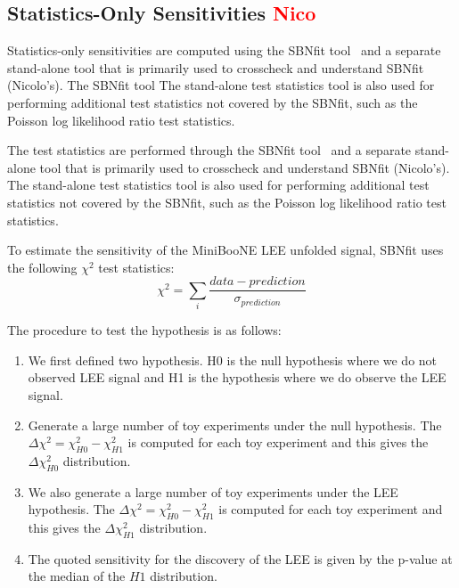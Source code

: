 \documentclass[a4paper]{article}
\begin{document}
\subsection{Statistics-Only Sensitivities \textcolor{red}{Nico}}
\label{subsec:teststats}

Statistics-only sensitivities are computed using the SBNfit tool~\cite{bib:sbnfit20437} and a separate stand-alone tool that is primarily used to crosscheck and understand SBNfit (Nicolo's).
The SBNfit tool 
The stand-alone test statistics tool is also used for performing additional test statistics not covered by the SBNfit, such as the Poisson log likelihood  ratio test statistics.


The test statistics are performed through the SBNfit tool~\cite{bib:sbnfit20437} and a separate stand-alone tool that is primarily used to crosscheck and understand SBNfit (Nicolo's). The stand-alone test statistics tool is also used for performing additional test statistics not covered by the SBNfit, such as the Poisson log likelihood  ratio test statistics.

To estimate the sensitivity of the MiniBooNE LEE unfolded signal, SBNfit uses the following $\chi^2$ test statistics:
\begin{equation}
\chi^2 = \sum_{i} \frac{data - prediction}{\sigma_{prediction}}
\end{equation}

The procedure to test the hypothesis is as follows:
\begin{enumerate}
    \item We first defined two hypothesis. H0 is the null hypothesis where we do not observed LEE signal and H1 is the hypothesis where we do observe the LEE signal. 
    \item Generate a large number of toy experiments under the null hypothesis. The $\Delta \chi^2 = \chi^2_{H0} - \chi^2_{H1}$ is computed for each toy experiment and this gives the $\Delta \chi^2_{H0}$ distribution.
    \item We also generate a large number of toy experiments under the LEE hypothesis. The $\Delta \chi^2 = \chi^2_{H0} - \chi^2_{H1}$ is computed for each toy experiment and this gives the $\Delta \chi^2_{H1}$ distribution.
    \item The quoted sensitivity for the discovery of the LEE is given by the p-value at the median of the $H1$ distribution.
\end{enumerate}
\end{document}
